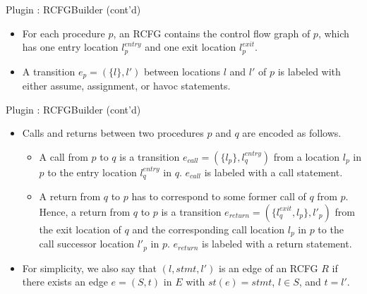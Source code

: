 \documentclass[12pt]{beamer}
\begin{document}
\begin{frame}{Plugin : RCFGBuilder (cont'd)}
	\begin{itemize}
		\item For each procedure $p$, an RCFG contains the control flow graph of $p$, which has one entry location $l^{entry}_{p}$ and one exit location $l^{exit}_{p}$.
		\item A transition $e_{p} = (\{l\}, l')$ between locations $l$ and $l'$ of $p$ is labeled with either assume, assignment, or havoc statements.
	\end{itemize}
\end{frame}

\begin{frame}{Plugin : RCFGBuilder (cont'd)}
	\begin{itemize}
		\item Calls and returns between two procedures $p$ and $q$ are encoded as follows.
		\begin{itemize}
			\item A call from $p$ to $q$ is a transition $e_{call} = (\{l_{p}\}, l^{entry}_{q})$ from a location $l_{p}$ in $p$ to the entry location $l^{entry}_{q}$ in $q$. $e_{call}$ is labeled with a call statement.
			\item A return from $q$ to $p$ has to correspond to some former call of $q$ from $p$. Hence, a return from $q$ to $p$ is a transition $e_{return} = (\{l^{exit}_{q}, l_{p}\}, l'_{p})$ from the exit location of $q$ and the corresponding call location $l_{p}$ in $p$ to the call successor location $l'_{p}$ in $p$. $e_{return}$ is labeled with a return statement.
		\end{itemize}
		\item For simplicity, we also say that $(l, stmt, l′)$ is an edge of an RCFG $R$ if there
		exists an edge $e = (S, t)$ in $E$ with $st(e) = stmt$, $l \in S$, and $t = l'$.
	\end{itemize}
\end{frame}
\end{document}
